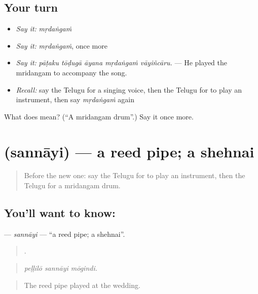 \subsection*{Your turn}
\begin{itemize}
\raggedright
  \item \emph{Say it:} \emph{mṛdaṅgaṁ}
  \item \emph{Say it:} \emph{mṛdaṅgaṁ}, once more
  \item \emph{Say it:} \emph{pāṭaku tōḍugā āyana mṛdaṅgaṁ vāyiñcāru.} — He played the mridangam to accompany the song.
  \item \emph{Recall:} say the Telugu for a singing voice, then the Telugu for to play an instrument, then say \emph{mṛdaṅgaṁ} again
\end{itemize}

\begin{tcolorbox}[breakable,colback=teal!4,colframe=teal!35!black,title={Before you move on}]
What does  mean? (\textquotedblleft{}A mridangam drum\textquotedblright{}.) Say it once more.
\end{tcolorbox}
\section[\texorpdfstring{\te{సన్నాయి} (sannāyi)}{సన్నాయి (sannāyi)}]{ (sannāyi) — a reed pipe; a shehnai}

\label{lesson:TE-C538-sannayi}



\begin{quote}
Before the new one: say the Telugu for to play an instrument, then the Telugu for a mridangam drum.
\end{quote}

\subsection*{You'll want to know: }
\textbf{} — \emph{sannāyi} — \textquotedblleft{}a reed pipe; a shehnai\textquotedblright{}.

\begin{quote}
  .
\end{quote}

\begin{quote}
\emph{peḷḷilō sannāyi mōgindi.}
\end{quote}

\begin{quote}
The reed pipe played at the wedding.
\end{quote}

